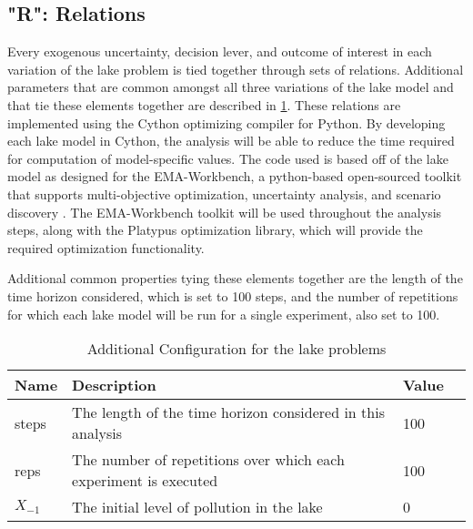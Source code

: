     \subsection{"R": Relations}\label{step1-R}
    Every exogenous uncertainty, decision lever, and outcome of interest in each variation of the lake problem is tied together through sets of relations. Additional parameters that are common amongst all three variations of the lake model and that tie these elements together are described in \cref{table:lakeadditional}. These relations are implemented using the Cython optimizing compiler for Python. By developing each lake model in Cython, the analysis will be able to reduce the time required for computation of model-specific values. The code used is based off of the lake model as designed for the EMA-Workbench, a python-based open-sourced toolkit that supports multi-objective optimization, uncertainty analysis, and scenario discovery \citep{Kwakkel2017}. The EMA-Workbench toolkit will be used throughout the analysis steps, along with the Platypus optimization library, which will provide the required optimization functionality. 
    
    Additional common properties tying these elements together are the length of the time horizon considered, which is set to 100 steps, and the number of repetitions for which each lake model will be run for a single experiment, also set to 100.

    \begin{table}[h]
        \caption{Additional Configuration for the lake problems}
        
        \label{table:lakeadditional}
        
        \setlength\arrayrulewidth{1pt}
        \begin{tabularx}{\linewidth}{l|X|l|l}
            \rowcolor{tudelft-dark-blue!80}
            \color{white}\bfseries Name     &      \color{white}\bfseries Description   &
            \color{white}\bfseries Value    \\
            
            \hline
            steps              & The length of the time horizon considered in this analysis             & 100\\
            \hline
            reps               & The number of repetitions over which each experiment is executed       & 100\\
            \hline
            $X_{-1}$           & The initial level of pollution in the lake                             & 0\\
            
        \end{tabularx}
    \end{table}
